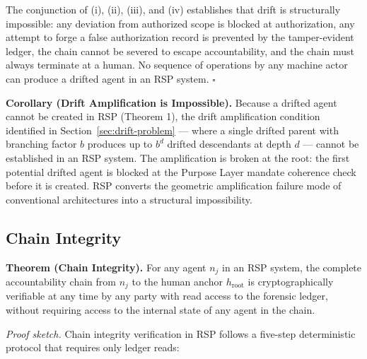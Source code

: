 The conjunction of (i), (ii), (iii), and (iv) establishes that drift is structurally impossible: any deviation from authorized scope is blocked at authorization, any attempt to forge a false authorization record is prevented by the tamper-evident ledger, the chain cannot be severed to escape accountability, and the chain must always terminate at a human. No sequence of operations by any machine actor can produce a drifted agent in an RSP system. $\square$

\textbf{Corollary (Drift Amplification is Impossible).} Because a drifted agent cannot be created in RSP (Theorem 1), the drift amplification condition identified in Section~\ref{sec:drift-problem} — where a single drifted parent with branching factor $b$ produces up to $b^d$ drifted descendants at depth $d$ — cannot be established in an RSP system. The amplification is broken at the root: the first potential drifted agent is blocked at the Purpose Layer mandate coherence check before it is created. RSP converts the geometric amplification failure mode of conventional architectures into a structural impossibility.

\subsection{Chain Integrity}
\label{sec:rs-chain-integrity}

\textbf{Theorem (Chain Integrity).} For any agent $n_j$ in an RSP system, the complete accountability chain from $n_j$ to the human anchor $h_{\text{root}}$ is cryptographically verifiable at any time by any party with read access to the forensic ledger, without requiring access to the internal state of any agent in the chain.

\medskip
\noindent\textit{Proof sketch.} Chain integrity verification in RSP follows a five-step deterministic protocol that requires only ledger reads:


